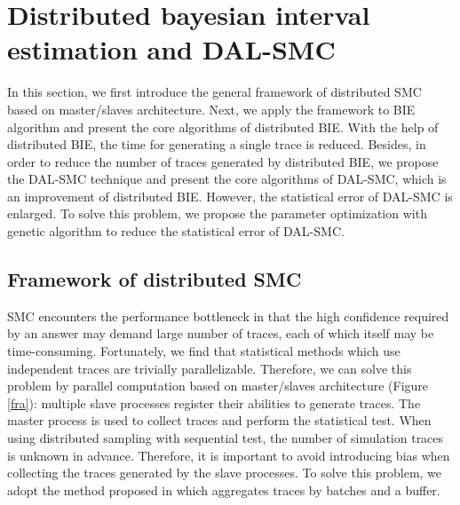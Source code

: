 \section{Distributed bayesian interval estimation and DAL-SMC}

In this section, we first introduce the general framework of distributed SMC based on master/slaves architecture. Next, we apply the framework to BIE algorithm and present the core algorithms of distributed BIE. With the help of distributed BIE, the time for generating a single trace is reduced. Besides, in order to reduce the number of traces generated by distributed BIE, we propose the DAL-SMC technique and present the core algorithms of DAL-SMC, which is an improvement of distributed BIE. However, the statistical error of DAL-SMC is enlarged. To solve this problem, we propose the parameter optimization with genetic algorithm to reduce the statistical error of DAL-SMC.

\subsection{Framework of distributed SMC}

SMC encounters the performance bottleneck in that the high confidence required by an answer may demand large number of traces, each of which itself may be time-consuming. Fortunately, we find that statistical methods which use independent traces are trivially parallelizable. Therefore, we can solve this problem by parallel computation based on master/slaves architecture (Figure \ref{fra}): multiple slave processes register their abilities to generate traces. The master process is used to collect traces and perform the statistical test. When using distributed sampling with sequential test, the number of simulation traces is unknown in advance. Therefore, it is important to avoid introducing bias when collecting the traces generated by the slave processes. To solve this problem, we adopt the method proposed in \cite{Bulychev2012Checking} which aggregates traces by batches and a buffer.

